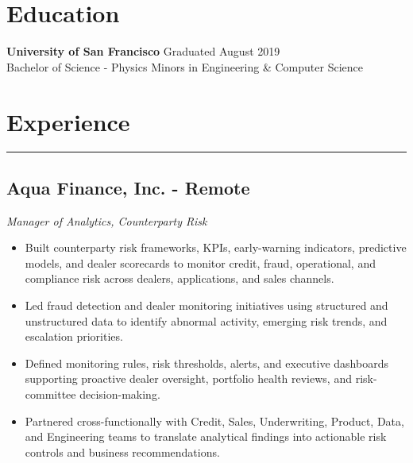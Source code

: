 \documentclass[11pt,a4paper]{article}
\newenvironment{myitemize}
{ \begin{itemize}[label={--}, leftmargin=*]
		\setlength{\itemsep}{0pt}
		\setlength{\parskip}{0pt}
		\setlength{\parsep}{0pt}     }
	{ \end{itemize}                  }
\begin{document}
	
	
\section*{Education}
	\vspace{-8mm} %
	\noindent\makebox[\linewidth]{\rule{\textwidth}{0.4pt}}
	\textbf{University of San Francisco} \hfill Graduated August 2019 \\
	Bachelor of Science - Physics \hfill Minors in Engineering \& Computer Science
	
		\vspace{-5mm} %
	
	\section*{Experience}
	\vspace{-3mm} %
	\hrule
	\vspace{3mm} %
	
	
	
	\subsection*{Aqua Finance, Inc. - Remote \hfill
			\vspace{-1mm} %
		  }
	\vspace{-1.5mm} %
	\textit{Manager of Analytics, Counterparty Risk}
	\vspace{-2.5mm} %
\begin{myitemize}
	\item Built counterparty risk frameworks, KPIs, early-warning indicators, predictive models, and dealer scorecards to monitor credit, fraud, operational, and compliance risk across dealers, applications, and sales channels.
	\item Led fraud detection and dealer monitoring initiatives using structured and unstructured data to identify abnormal activity, emerging risk trends, and escalation priorities.
	\item Defined monitoring rules, risk thresholds, alerts, and executive dashboards supporting proactive dealer oversight, portfolio health reviews, and risk-committee decision-making.
	\item Partnered cross-functionally with Credit, Sales, Underwriting, Product, Data, and Engineering teams to translate analytical findings into actionable risk controls and business recommendations.
\end{myitemize}
	
\end{document}
